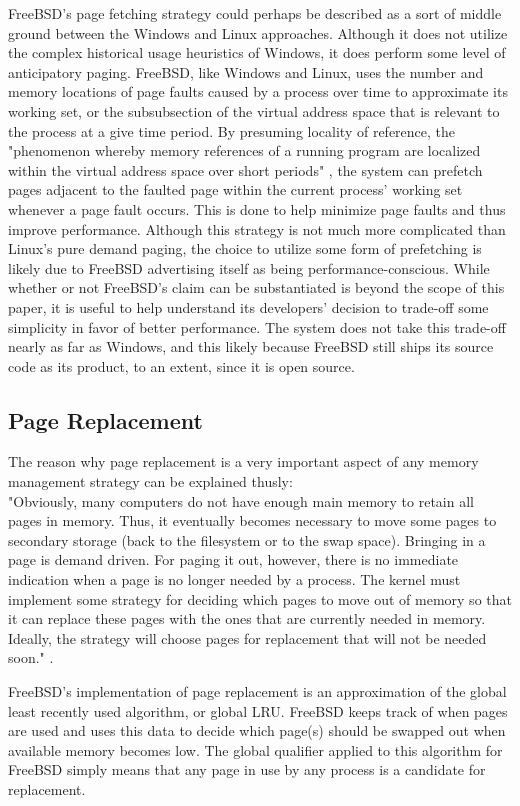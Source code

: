 \documentclass[onecolumn, draftclsnofoot,10pt, compsoc]{IEEEtran}
\begin{document}
FreeBSD's page fetching strategy could perhaps be described as a sort of middle ground between the Windows and Linux approaches. Although it does not utilize the complex historical usage heuristics of Windows, it does perform some level of anticipatory paging. FreeBSD, like Windows and Linux, uses the number and memory locations of page faults caused by a process over time to approximate its working set, or the subsubsection of the virtual address space that is relevant to the process at a give time period. By presuming locality of reference, the "phenomenon whereby memory references of a running program are localized within the virtual address space over short periods" \cite{FreeBSD}, the system can prefetch pages adjacent to the faulted page within the current process' working set whenever a page fault occurs. This is done to help minimize page faults and thus improve performance. Although this strategy is not much more complicated than Linux's pure demand paging, the choice to utilize some form of prefetching is likely due to FreeBSD advertising itself as being performance-conscious. While whether or not FreeBSD's claim can be substantiated is beyond the scope of this paper, it is useful to help understand its developers' decision to trade-off some simplicity in favor of better performance. The system does not take this trade-off nearly as far as Windows, and this likely because FreeBSD still ships its source code as its product, to an extent, since it is open source.

\subsection{Page Replacement}
The reason why page replacement is a very important aspect of any memory management strategy can be explained thusly:\\"Obviously, many computers do not have enough main memory to retain all pages in memory. Thus, it eventually becomes necessary to move some pages to secondary storage (back to the filesystem or to the swap space). Bringing in a page is demand driven. For paging it out, however, there is no immediate indication when a page is no longer needed by a process. The kernel must implement some strategy for deciding which pages to move out of memory so that it can replace these pages with the ones that are currently needed in memory. Ideally, the strategy will choose pages for replacement that will not be needed soon." \cite{FreeBSD}.
\par FreeBSD's implementation of page replacement is an approximation of the global least recently used algorithm, or global LRU. FreeBSD keeps track of when pages are used and uses this data to decide which page(s) should be swapped out when available memory becomes low. The global qualifier applied to this algorithm for FreeBSD simply means that any page in use by any process is a candidate for replacement. 
\end{document}
